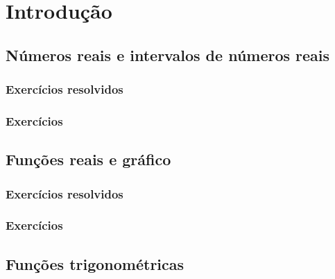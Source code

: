 
\chapter{Introdução}\label{chap:introducao}
\emconstrucao

\section{Números reais e intervalos de números reais}\label{sec:intro_reais}
\construirSec

\subsection*{Exercícios resolvidos}

\construirExeresol


\subsection*{Exercícios}

\construirExer


\section{Funções reais e gráfico}\label{sec:intro_fun_reais}
\construirSec

\subsection*{Exercícios resolvidos}

\construirExeresol


\subsection*{Exercícios}

\construirExer


\section{Funções trigonométricas}\label{sec:intro_trigo}
\construirSec

